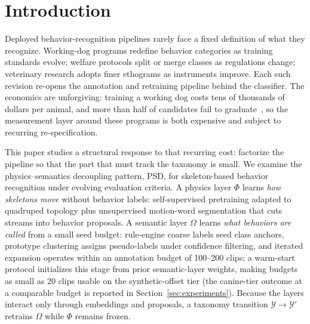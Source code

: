 \section{Introduction}\label{sec:intro}

Deployed behavior-recognition pipelines rarely face a fixed definition of what they recognize. Working-dog programs redefine behavior categories as training standards evolve; welfare protocols split or merge classes as regulations change; veterinary research adopts finer ethograms as instruments improve. Each such revision re-opens the annotation and retraining pipeline behind the classifier. The economics are unforgiving: training a working dog costs tens of thousands of dollars per animal, and more than half of candidates fail to graduate~\citep{grimm2026science}, so the measurement layer around these programs is both expensive and subject to recurring re-specification.

This paper studies a structural response to that recurring cost: factorize the pipeline so that the part that must track the taxonomy is small. We examine the physics--semantics decoupling pattern, PSD, for skeleton-based behavior recognition under evolving evaluation criteria. A physics layer $\Phi$ learns \emph{how skeletons move} without behavior labels: self-supervised pretraining adapted to quadruped topology plus unsupervised motion-word segmentation that cuts streams into behavior proposals. A semantic layer $\Omega$ learns \emph{what behaviors are called} from a small seed budget: rule-engine coarse labels seed class anchors, prototype clustering assigns pseudo-labels under confidence filtering, and iterated expansion operates within an annotation budget of 100--200 clips; a warm-start protocol initializes this stage from prior semantic-layer weights, making budgets as small as 20 clips usable on the synthetic-offset tier (the canine-tier outcome at a comparable budget is reported in Section~\ref{sec:experiments}). Because the layers interact only through embeddings and proposals, a taxonomy transition $\mathcal{Y}\to\mathcal{Y}'$ retrains $\Omega$ while $\Phi$ remains frozen.

